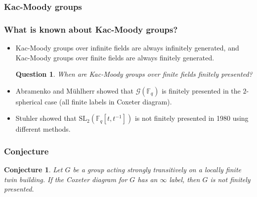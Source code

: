 \documentclass[xcolor=dvipsnames]{beamer}
\newcommand{\FF}{\mathbb{F}}
\newcommand{\cG}{\mathcal{G}}
\newcommand{\SL}{\mathrm{SL}}
\newtheorem{Ques}{Question}
\newtheorem{Conj}[Theo]{Conjecture}
\theoremstyle{definition}
\begin{document}
\begin{frame}
\frametitle{Kac-Moody groups}

\end{frame}

\begin{frame}
\frametitle{What is known about Kac-Moody groups?}
\begin{itemize}
\item Kac-Moody groups over infinite fields are always infinitely generated, and Kac-Moody groups over finite fields are always finitely generated.

\begin{Ques}
When are Kac-Moody groups over finite fields finitely presented?
\end{Ques}

\item Abramenko and M{\"u}hlherr showed that $\cG(\FF_q)$ is finitely presented in the $2$-spherical case (all finite labels in Coxeter diagram).
\item Stuhler showed that $\SL_2(\FF_q[t,t^{-1}])$ is not finitely presented in 1980 using different methods.


\end{itemize}
\end{frame}



\begin{frame}
\frametitle{Conjecture}
\begin{Conj}
Let $G$ be a group acting strongly transitively on a locally finite twin building. If the Coxeter diagram for $G$ has an $\infty$ label, then $G$ is not finitely presented.
\end{Conj}

\end{frame}
\end{document}
